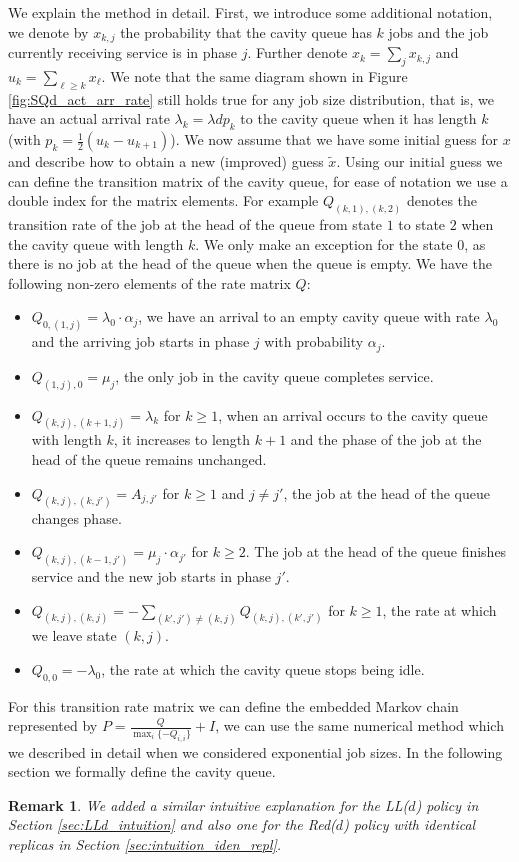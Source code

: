 \documentclass[12pt]{report}
\newtheorem{remark}{Remark}
\begin{document}
We explain the method in detail. First, we introduce some additional notation, we denote by $x_{k,j}$ the probability that the cavity queue has $k$ jobs and the job currently receiving service is in phase $j$.
 Further denote $x_k = \sum_j x_{k,j}$ and $u_k = \sum_{\ell \geq k} x_\ell$. We note that the same diagram shown in Figure \ref{fig:SQd_act_arr_rate} still holds true for any job size distribution, that is, we have an actual arrival rate $\lambda_k = \lambda d p_k$ to the cavity queue when it has length $k$ (with $p_k = \frac{1}{2} \left(u_k - u_{k+1} \right)$). We now assume that we have some initial guess for $x$ and describe how to obtain a new (improved) guess $\tilde x$. Using our initial guess we can define the transition matrix of the cavity queue, for ease of notation we use a double index for the matrix elements. For example $Q_{(k,1), (k,2)}$ denotes the transition rate of the job at the head of the queue from state $1$ to state $2$ when the cavity queue with length $k$. We only make an exception for the state $0$, as there is no job at the head of the queue when the queue is empty. We have the following non-zero elements of the rate matrix $Q$:
\begin{itemize}
	\item $Q_{0,(1,j)} = \lambda_0 \cdot \alpha_j$, we have an arrival to an empty cavity queue with rate $\lambda_0$ and the arriving job starts in phase $j$ with probability $\alpha_j$.
	\item $Q_{(1,j),0} = \mu_j$, the only job in the cavity queue completes service.
	\item $Q_{(k,j), (k+1,j)} = \lambda_k$ for $k\geq 1$, when an arrival occurs to the cavity queue with length $k$, it increases to length $k+1$ and the phase of the job at the head of the queue remains unchanged.
	\item $Q_{(k,j), (k,j')} = A_{j, j'}$ for $k\geq 1$ and $j \neq j'$, the job at the head of the queue changes phase.
	\item $Q_{(k,j), (k-1, j')} = \mu_j \cdot \alpha_{j'}$ for $k\geq 2$. The job at the head of the queue finishes service and the new job starts in phase $j'$.
	\item $Q_{(k,j), (k,j)} = - \sum_{(k',j') \neq (k,j)} Q_{(k,j), (k',j')}$ for $k \geq 1$, the rate at which we leave state $(k,j)$.
	\item $Q_{0,0} = -\lambda_0$, the rate at which the cavity queue stops being idle.
\end{itemize}
For this transition rate matrix we can define the embedded Markov chain represented by $P= \frac{Q}{\max_i\{-Q_{i,i}\}} + I$, we can use the same numerical method which we described in detail when we considered exponential job sizes. In the following section we formally define the cavity queue.
\begin{remark}
	We added a similar intuitive explanation for the LL($d$) policy in Section \ref{sec:LLd_intuition} and also one for the Red($d$) policy with identical replicas in Section \ref{sec:intuition_iden_repl}.
\end{remark}
\end{document}
